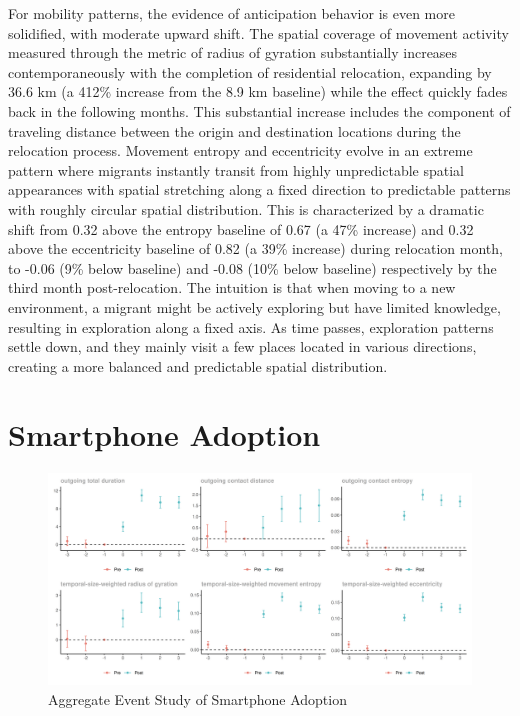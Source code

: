 For mobility patterns, the evidence of anticipation behavior is even more solidified, with moderate upward shift.
The spatial coverage of movement activity measured through the metric of radius of gyration substantially increases contemporaneously with the completion of residential relocation, expanding by 36.6 km (a 412\% increase from the 8.9 km baseline) while the effect quickly fades back in the following months. This substantial increase includes the component of traveling distance between the origin and destination locations during the relocation process.
Movement entropy and eccentricity evolve in an extreme pattern where migrants instantly transit from highly unpredictable spatial appearances with spatial stretching along a fixed direction to predictable patterns with roughly circular spatial distribution.
This is characterized by a dramatic shift from 0.32 above the entropy baseline of 0.67 (a 47\% increase) and 0.32 above the eccentricity baseline of 0.82 (a 39\% increase) during relocation month, to -0.06 (9\% below baseline) and -0.08 (10\% below baseline) respectively by the third month post-relocation. The intuition is that when moving to a new environment, a migrant might be actively exploring but have limited knowledge, resulting in exploration along a fixed axis. As time passes, exploration patterns settle down, and they mainly visit a few places located in various directions, creating a more balanced and predictable spatial distribution.


\section{Smartphone Adoption}
\begin{figure}[h!]
\centering
\caption{Aggregate Event Study of Smartphone Adoption}
\vspace{0.1cm}

\includegraphics[scale=0.49]{figures/csdid/smartphone_adoption.png}

\label{fig:event_study_smartphone_adoption}
\end{figure}

